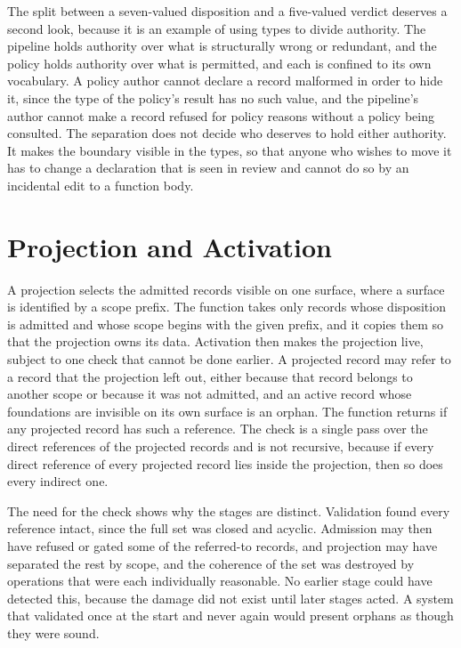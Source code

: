 The split between a seven-valued disposition and a five-valued verdict deserves a second look, because it is an example of using types to divide authority. The pipeline holds authority over what is structurally wrong or redundant, and the policy holds authority over what is permitted, and each is confined to its own vocabulary. A policy author cannot declare a record malformed in order to hide it, since the type of the policy's result has no such value, and the pipeline's author cannot make a record refused for policy reasons without a policy being consulted. The separation does not decide who deserves to hold either authority. It makes the boundary visible in the types, so that anyone who wishes to move it has to change a declaration that is seen in review and cannot do so by an incidental edit to a function body.

\section{Projection and Activation}

A projection selects the admitted records visible on one surface, where a surface is identified by a scope prefix. The function  takes only records whose disposition is admitted and whose scope begins with the given prefix, and it copies them so that the projection owns its data. Activation then makes the projection live, subject to one check that cannot be done earlier. A projected record may refer to a record that the projection left out, either because that record belongs to another scope or because it was not admitted, and an active record whose foundations are invisible on its own surface is an orphan. The function  returns  if any projected record has such a reference. The check is a single pass over the direct references of the projected records and is not recursive, because if every direct reference of every projected record lies inside the projection, then so does every indirect one.

The need for the check shows why the stages are distinct. Validation found every reference intact, since the full set was closed and acyclic. Admission may then have refused or gated some of the referred-to records, and projection may have separated the rest by scope, and the coherence of the set was destroyed by operations that were each individually reasonable. No earlier stage could have detected this, because the damage did not exist until later stages acted. A system that validated once at the start and never again would present orphans as though they were sound.

